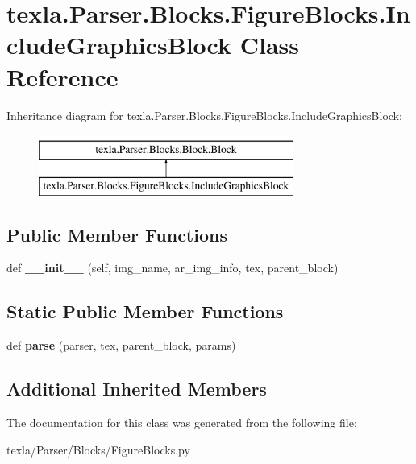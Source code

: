 \hypertarget{classtexla_1_1Parser_1_1Blocks_1_1FigureBlocks_1_1IncludeGraphicsBlock}{}\section{texla.\+Parser.\+Blocks.\+Figure\+Blocks.\+Include\+Graphics\+Block Class Reference}
\label{classtexla_1_1Parser_1_1Blocks_1_1FigureBlocks_1_1IncludeGraphicsBlock}
Inheritance diagram for texla.\+Parser.\+Blocks.\+Figure\+Blocks.\+Include\+Graphics\+Block\+:\begin{figure}[H]
\begin{center}
\leavevmode
\includegraphics[height=2.000000cm]{classtexla_1_1Parser_1_1Blocks_1_1FigureBlocks_1_1IncludeGraphicsBlock}
\end{center}
\end{figure}
\subsection*{Public Member Functions}
\begin{DoxyCompactItemize}
\item 
\hypertarget{classtexla_1_1Parser_1_1Blocks_1_1FigureBlocks_1_1IncludeGraphicsBlock_a93ccc4cb679dfb2a036f0ab875ba7e75}{}\label{classtexla_1_1Parser_1_1Blocks_1_1FigureBlocks_1_1IncludeGraphicsBlock_a93ccc4cb679dfb2a036f0ab875ba7e75} 
def {\bfseries \+\_\+\+\_\+init\+\_\+\+\_\+} (self, img\+\_\+name, ar\+\_\+img\+\_\+info, tex, parent\+\_\+block)
\end{DoxyCompactItemize}
\subsection*{Static Public Member Functions}
\begin{DoxyCompactItemize}
\item 
\hypertarget{classtexla_1_1Parser_1_1Blocks_1_1FigureBlocks_1_1IncludeGraphicsBlock_abf8847a83e889f0c1228e7a261e51495}{}\label{classtexla_1_1Parser_1_1Blocks_1_1FigureBlocks_1_1IncludeGraphicsBlock_abf8847a83e889f0c1228e7a261e51495} 
def {\bfseries parse} (parser, tex, parent\+\_\+block, params)
\end{DoxyCompactItemize}
\subsection*{Additional Inherited Members}


The documentation for this class was generated from the following file\+:\begin{DoxyCompactItemize}
\item 
texla/\+Parser/\+Blocks/Figure\+Blocks.\+py\end{DoxyCompactItemize}

